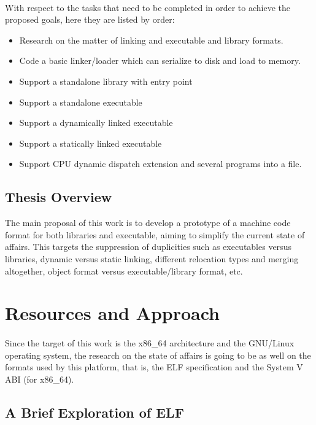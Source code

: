 \documentclass[12pt]{article}
\begin{document}
	\paragraph{}With respect to the tasks that need to be completed in order to achieve the proposed goals, here they are listed by order:
	\begin{itemize}
		\item Research on the matter of linking and executable and library formats.
		\item Code a basic linker/loader which can serialize to disk and load to memory.
		\item Support a standalone library with entry point
		\item Support a standalone executable
		\item Support a dynamically linked executable
		\item Support a statically linked executable
		\item Support CPU dynamic dispatch extension and several programs into a file.
	\end{itemize}
	
	\subsection{Thesis Overview}
	The main proposal of this work is to develop a prototype of a machine code format for both libraries and executable, aiming to simplify the current state of affairs. This targets the suppression of duplicities such as executables versus libraries, dynamic versus static linking, different relocation types and merging altogether, object format versus executable/library format, etc.
	
	\newpage
	\section{Resources and Approach}
	
	\paragraph{}Since the target of this work is the x86\_64 architecture and the \acrshort{GNU}/Linux operating system, the research on the state of affairs is going to be as well on the formats used by this platform, that is, the \acrshort{ELF} specification and the System V ABI (for x86\_64).

	\subsection{A Brief Exploration of ELF}
	
\end{document}
